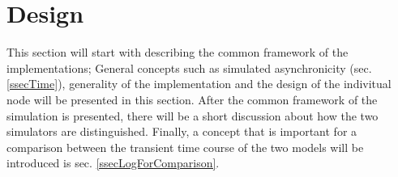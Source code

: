 %
%
%






\section{Design} %

	This section will start with describing the common framework of the implementations; 
		General concepts such as simulated asynchronicity (sec.\ref{ssecTime}), generality of the implementation and the design of the indivitual node will be presented in this section. %
	After the common framework of the simulation is presented, there will be a short discussion about how the two simulators are distinguished. %
	Finally, a concept that is important for a comparison between the transient time course of the two models will be introduced is sec. \ref{ssecLogForComparison}. %
	
	


